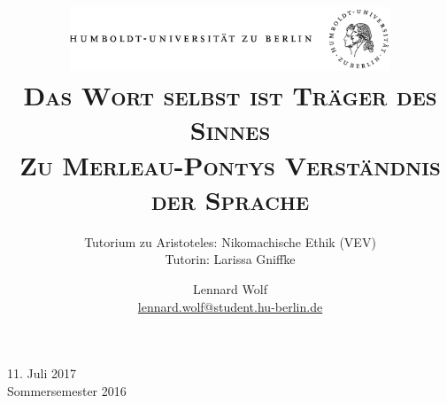 \documentclass[a4paper, emulatestandardclasses, 12pt]{scrartcl}
\date{\vspace{-3ex}}
\begin{document}
\title{\vspace{5ex}
	\includegraphics*[width=0.72\textwidth]{ErstesSem/images/hu_logo.png}\\
	\vspace{30pt}
	\scshape\LARGE{Das Wort selbst ist Träger des Sinnes\\Zu Merleau-Pontys Verständnis der Sprache}}
	
	\subtitle{\vspace{20pt}Tutorium zu Aristoteles: Nikomachische Ethik (VEV)\\
	\vspace{6pt}
          Tutorin: Larissa Gniffke}


\author{\vspace{-4pt}Lennard Wolf\\
        \small{\href{mailto:lennard.wolf@student.hu-berlin.de}{lennard.wolf@student.hu-berlin.de}}}      

\maketitle

\vspace{\fill}

\begin{minipage}[b]{\textwidth}
    \centering
    \onehalfspacing
    \large   
    11. Juli 2017\\
    Sommersemester 2016

    \vspace{-20mm} 
\end{minipage}%
\thispagestyle{empty}
\newpage
\setcounter{page}{1}
\end{document}
